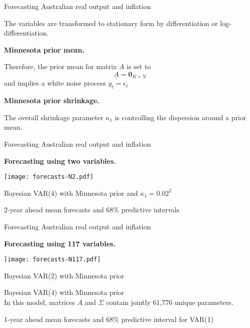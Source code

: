 \documentclass[notes,blackandwhite,mathsans,usenames,dvipsnames]{beamer}
\begin{document}
\begin{frame}{Forecasting Australian real output and inflation}

{\color{mcxs2}The variables are transformed to stationary form by differentiation or log-differentiation.}

\bigskip\textbf{Minnesota prior mean.}

{\color{mcxs2}Therefore, the prior mean for matrix} $A$ {\color{mcxs2}is set to}
$$ \underline{A} = \mathbf{0}_{K\times N} $$
{\color{mcxs2}and implies a} {\color{purple}white noise} {\color{mcxs2}process} $ y_t = \epsilon_t $



\bigskip\textbf{Minnesota prior shrinkage.}

{\color{mcxs2}The overall shrinkage parameter} $\kappa_1$ {\color{mcxs2}is controlling the dispersion around a prior mean.}

\end{frame}









\begin{frame}{Forecasting Australian real output and inflation}

\textbf{Forecasting using two variables.}

\bigskip
\centering
\texttt{[image: forecasts-N2.pdf]}


{\color{mcxs2}Bayesian VAR(4) with Minnesota prior and $\kappa_1=0.02^2$}

\bigskip\footnotesize
2-year ahead mean forecasts and 68\% predictive intervals
\end{frame}




\begin{frame}{Forecasting Australian real output and inflation}

\textbf{Forecasting using 117 variables.}

\bigskip
\centering
\texttt{[image: forecasts-N117.pdf]}


{\color{mcxs2}Bayesian VAR(2) with Minnesota prior}

{\color{mcxs1}Bayesian VAR(4) with Minnesota prior\\ \scriptsize
In this model, matrices $A$ and $\Sigma$ contain jointly 61,776 unique parameters.}

\bigskip\footnotesize
1-year ahead mean forecasts and 68\% predictive interval for VAR(1)

\end{frame}
\end{document}
